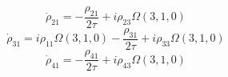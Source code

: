 \documentclass{article}
\begin{document}
\begin{equation}
\dot{\rho}_{21} = - \frac{\rho_{21}}{2 \tau} + i \rho_{23} \Omega{\left(3,1,0 \right)}
\end{equation}
\begin{equation}
\dot{\rho}_{31} = i \rho_{11} \Omega{\left(3,1,0 \right)} - \frac{\rho_{31}}{2 \tau} + i \rho_{33} \Omega{\left(3,1,0 \right)}
\end{equation}
\begin{equation}
\dot{\rho}_{41} = - \frac{\rho_{41}}{2 \tau} + i \rho_{43} \Omega{\left(3,1,0 \right)}
\end{equation}
\end{document}
